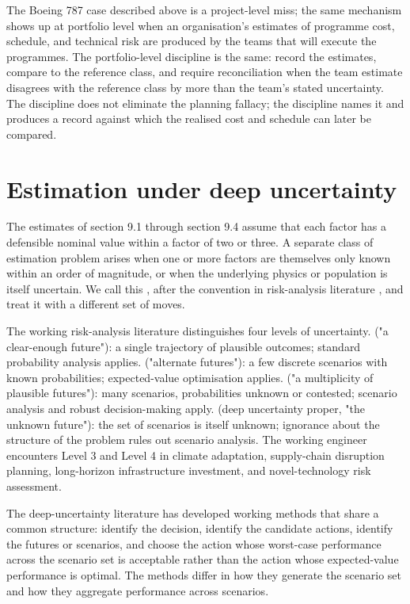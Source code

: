 The Boeing 787 case described above is a project-level miss;
the same mechanism shows up at portfolio level when an
organisation's estimates of programme cost, schedule, and
technical risk are produced by the teams that will execute the
programmes. The portfolio-level discipline is the same: record
the estimates, compare to the reference class, and require
reconciliation when the team estimate disagrees with the
reference class by more than the team's stated uncertainty.
The discipline does not eliminate the planning fallacy; the
discipline names it and produces a record against which the
realised cost and schedule can later be compared.

\section{Estimation under deep uncertainty}

The estimates of section 9.1 through section 9.4 assume that each
factor has a defensible nominal value within a factor of two or
three. A separate class of estimation problem arises when one or
more factors are themselves only known within an order of
magnitude, or when the underlying physics or population is itself
uncertain. We call this , after the
convention in risk-analysis literature
\cite{paper:lempert-2003-shaping-future,paper:walker-2003-deep-uncertainty},
and treat it with a different set of moves.

The working risk-analysis literature distinguishes four levels of
uncertainty.  ("a clear-enough future"): a
single trajectory of plausible outcomes; standard probability
analysis applies.  ("alternate futures"): a few
discrete scenarios with known probabilities; expected-value
optimisation applies.  ("a multiplicity of
plausible futures"): many scenarios, probabilities unknown or
contested; scenario analysis and robust decision-making apply.
 (deep uncertainty proper, "the unknown
future"): the set of scenarios is itself unknown; ignorance about
the structure of the problem rules out scenario analysis. The
working engineer encounters Level 3 and Level 4 in climate
adaptation, supply-chain disruption planning, long-horizon
infrastructure investment, and novel-technology risk assessment.

The deep-uncertainty literature has developed working methods
that share a common structure: identify the decision, identify
the candidate actions, identify the futures or scenarios, and
choose the action whose worst-case performance across the
scenario set is acceptable rather than the action whose
expected-value performance is optimal. The methods differ in
how they generate the scenario set and how they aggregate
performance across scenarios.

